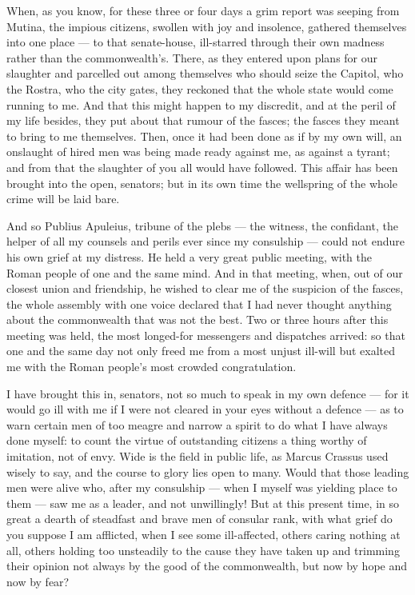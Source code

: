  When, as you know, for these three or four days a grim report was seeping from Mutina, the impious citizens, swollen with joy and insolence, gathered themselves into one place --- to that senate-house, ill-starred through their own madness rather than the commonwealth's. There, as they entered upon plans for our slaughter and parcelled out among themselves who should seize the Capitol, who the Rostra, who the city gates, they reckoned that the whole state would come running to me. And that this might happen to my discredit, and at the peril of my life besides, they put about that rumour of the fasces; the fasces they meant to bring to me themselves. Then, once it had been done as if by my own will, an onslaught of hired men was being made ready against me, as against a tyrant; and from that the slaughter of you all would have followed. This affair has been brought into the open, senators; but in its own time the wellspring of the whole crime will be laid bare.

 And so Publius Apuleius, tribune of the plebs --- the witness, the confidant, the helper of all my counsels and perils ever since my consulship --- could not endure his own grief at my distress. He held a very great public meeting, with the Roman people of one and the same mind. And in that meeting, when, out of our closest union and friendship, he wished to clear me of the suspicion of the fasces, the whole assembly with one voice declared that I had never thought anything about the commonwealth that was not the best. Two or three hours after this meeting was held, the most longed-for messengers and dispatches arrived: so that one and the same day not only freed me from a most unjust ill-will but exalted me with the Roman people's most crowded congratulation.

 I have brought this in, senators, not so much to speak in my own defence --- for it would go ill with me if I were not cleared in your eyes without a defence --- as to warn certain men of too meagre and narrow a spirit to do what I have always done myself: to count the virtue of outstanding citizens a thing worthy of imitation, not of envy. Wide is the field in public life, as Marcus Crassus used wisely to say, and the course to glory lies open to many. Would that those leading men were alive who, after my consulship --- when I myself was yielding place to them --- saw me as a leader, and not unwillingly! But at this present time, in so great a dearth of steadfast and brave men of consular rank, with what grief do you suppose I am afflicted, when I see some ill-affected, others caring nothing at all, others holding too unsteadily to the cause they have taken up and trimming their opinion not always by the good of the commonwealth, but now by hope and now by fear?

